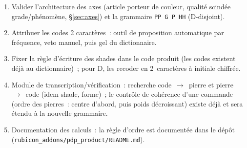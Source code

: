\documentclass[11pt,a4paper]{article}
\newcommand{\code}[1]{\texttt{#1}}
\begin{document}
\begin{enumerate}
\item Valider l'architecture des axes (article porteur de couleur,
  qualité scindée grade/phénomène, §\ref{sec:axes}) et la grammaire
  \code{PP\,G\,P\,HH} (D-disjoint).
\item Attribuer les codes 2 caractères~: outil de proposition automatique
  par fréquence, veto manuel, puis gel du dictionnaire.
\item Fixer la règle d'écriture des shades dans le code produit (les
  codes existent déjà au dictionnaire)~; pour D, les recoder en
  2~caractères à initiale chiffrée.
\item Module de transcription/vérification~: recherche code~$\to$~pierre et
  pierre~$\to$~code (idem shade, forme)~; le contrôle de cohérence d'une
  commande (ordre des pierres~: centre d'abord, puis poids décroissant)
  existe déjà et sera étendu à la nouvelle grammaire.
\item Documentation des calculs~: la règle d'ordre est documentée dans le
  dépôt (\code{rubicon\_addons/pdp\_product/README.md}).
\end{enumerate}
\end{document}
